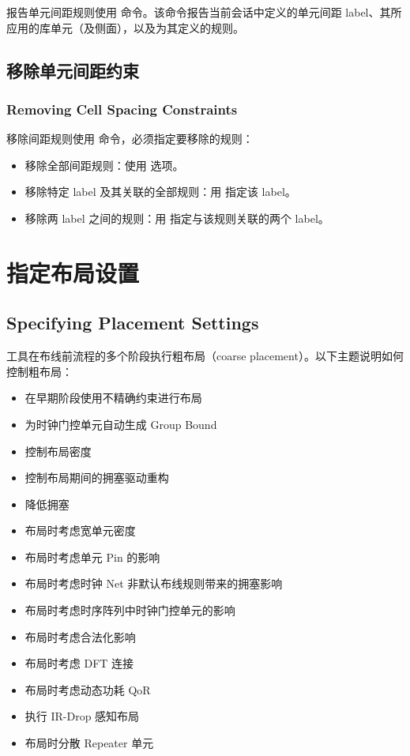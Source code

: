 报告单元间距规则使用  命令。该命令报告当前会话中定义的单元间距 label、其所应用的库单元（及侧面），以及为其定义的规则。

\subsection{移除单元间距约束}
\subsubsection*{Removing Cell Spacing Constraints}

移除间距规则使用  命令，必须指定要移除的规则：
\begin{itemize}
  \item 移除全部间距规则：使用  选项。
  \item 移除特定 label 及其关联的全部规则：用  指定该 label。
  \item 移除两 label 之间的规则：用  指定与该规则关联的两个 label。
\end{itemize}

\section{指定布局设置}
\subsection*{Specifying Placement Settings}

工具在布线前流程的多个阶段执行粗布局（coarse placement）。以下主题说明如何控制粗布局：
\begin{itemize}
  \item 在早期阶段使用不精确约束进行布局
  \item 为时钟门控单元自动生成 Group Bound
  \item 控制布局密度
  \item 控制布局期间的拥塞驱动重构
  \item 降低拥塞
  \item 布局时考虑宽单元密度
  \item 布局时考虑单元 Pin 的影响
  \item 布局时考虑时钟 Net 非默认布线规则带来的拥塞影响
  \item 布局时考虑时序阵列中时钟门控单元的影响
  \item 布局时考虑合法化影响
  \item 布局时考虑 DFT 连接
  \item 布局时考虑动态功耗 QoR
  \item 执行 IR-Drop 感知布局
  \item 布局时分散 Repeater 单元
\end{itemize}

